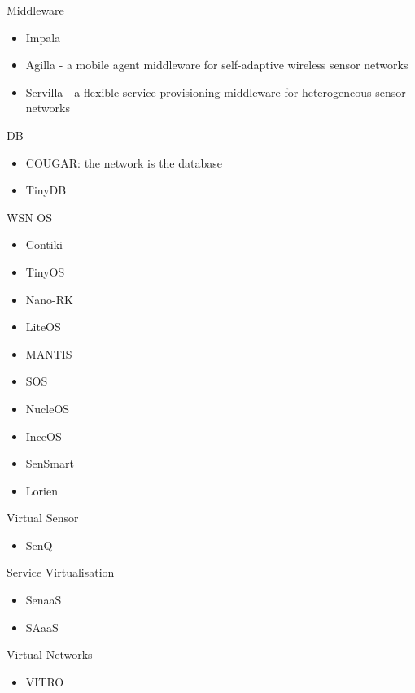 Middleware

\begin{itemize}
	\item Impala
	\item Agilla -  a mobile agent middleware for self-adaptive wireless sensor networks
	\item Servilla - a flexible service 	provisioning middleware for heterogeneous sensor networks
\end{itemize}


DB

\begin{itemize}
	\item COUGAR: the network is the database
	\item TinyDB
	
	
\end{itemize}



WSN OS

\begin{itemize}
	\item Contiki
	\item TinyOS
	\item Nano-RK
	\item LiteOS
	\item MANTIS
	\item SOS
	\item NucleOS
	\item InceOS
	\item SenSmart
	\item Lorien
\end{itemize}

Virtual Sensor

\begin{itemize}
	\item SenQ
\end{itemize}

Service Virtualisation

\begin{itemize}
	\item SenaaS
	\item SAaaS
\end{itemize}

Virtual Networks

\begin{itemize}
	\item VITRO
\end{itemize}


